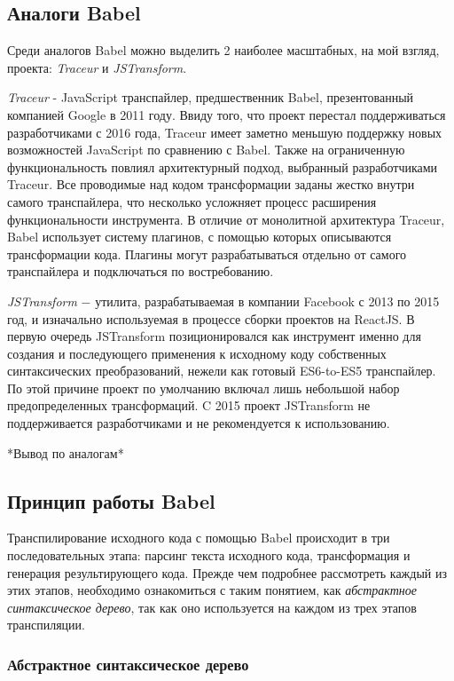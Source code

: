 \documentclass[14pt, a4paper]{article}
\begin{document}
\subsection{Аналоги Babel}
Среди аналогов Babel можно выделить 2 наиболее масштабных, на мой взгляд, проекта: 
\textit{Traceur} и \textit{JSTransform}.

\textit{Traceur} \cite{traceur} - JavaScript транспайлер, предшественник Babel, презентованный компанией Google в 2011 году. 
Ввиду того, что проект перестал поддерживаться разработчиками с 2016 года, Traceur имеет заметно 
меньшую поддержку новых возможностей JavaScript по сравнению с Babel. Также на ограниченную 
функциональность повлиял архитектурный подход, выбранный разработчиками Traceur. Все проводимые над 
кодом трансформации заданы жестко внутри самого транспайлера, что несколько усложняет процесс расширения 
функциональности инструмента. В отличие от монолитной архитектура Traceur, Babel использует систему 
плагинов, с помощью которых описываются трансформации кода. Плагины могут разрабатываться отдельно 
от самого транспайлера и подключаться по востребованию.

\textit{JSTransform} \cite{jstransform} $-$ утилита, разрабатываемая в компании Facebook с 2013 по 2015 год, и изначально используемая 
в процессе сборки проектов на ReactJS. В первую очередь JSTransform позиционировался как
инструмент именно для создания и последующего применения к исходному коду собственных синтаксических преобразований, 
нежели как готовый ES6-to-ES5 транспайлер. По этой причине проект по умолчанию включал лишь небольшой 
набор предопределенных трансформаций. C 2015 проект JSTransform не поддерживается разработчиками и 
не рекомендуется к использованию.

*Вывод по аналогам*

\subsection{Принцип работы Babel}

Транспилирование исходного кода с помощью Babel происходит в три последовательных этапа: парсинг текста 
исходного кода, трансформация и генерация результирующего кода. Прежде чем подробнее рассмотреть каждый из 
этих этапов, необходимо ознакомиться с таким понятием, как \textit{абстрактное синтаксическое дерево}, 
так как оно используется на каждом из трех этапов транспиляции.

\subsubsection{Абстрактное синтаксическое дерево}
\end{document}
